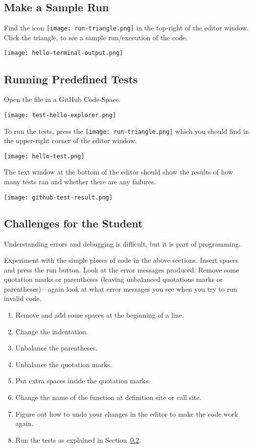 \subsection{Make a Sample Run}

Find the icon \texttt{[image: run-triangle.png]} in the
top-right of the editor window.  Click the triangle, to see a sample
run/execution of the code.

\noindent\texttt{[image: hello-terminal-output.png]}


\subsection{Running Predefined Tests}
\label{sec.run.tests}

Open the file  in a GitHub Code-Space.

\noindent\texttt{[image: test-hello-explorer.png]}

To run the tests, press the
\texttt{[image: run-triangle.png]} which you should find in
the upper-right corner of the editor window.

\noindent\texttt{[image: hello-test.png]}


The text window at the bottom of the editor should show the results of
how many tests ran and whether there are any failures.

\noindent\texttt{[image: github-test-result.png]}



\subsection{Challenges for the Student}

Understanding errors and debugging is difficult, but it is part of
programming.

Experiment with the simple pieces of code in the above sections.
Insert spaces and press the run button.  Look at the error messages
produced. Remove some quotation marks or parentheses (leaving
unbalanced quotations marks or parentheses)---again look at what error
messages you see when you try to run invalid code.


\begin{enumerate}
\item Remove and add some spaces at the beginning of a line.
\item Change the indentation.
\item Unbalance the parentheses.
\item Unbalance the quotation marks.
\item Put extra spaces inside the quotation marks.
\item Change the name of the  function at definition site
  or call site.
\item Figure out how to undo your changes in the editor to make the
  code work again.
\item Run the tests  as explained in
  Section~\ref{sec.run.tests}.
\end{enumerate}

\clearpage

